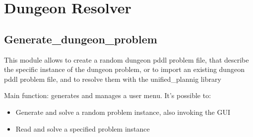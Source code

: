 \documentclass[letterpaper,10pt,english]{sphinxmanual}
\begin{document}
\section{Dungeon Resolver}
\label{\detokenize{api_reference/dungeon_resolver:dungeon-resolver}}\label{\detokenize{api_reference/dungeon_resolver::doc}}
\sphinxstepscope


\subsection{Generate\_dungeon\_problem}
\label{\detokenize{api_reference/dungeon_resolver/generate_dungeon_problem:module-generate_dungeon_problem}}\label{\detokenize{api_reference/dungeon_resolver/generate_dungeon_problem:generate-dungeon-problem}}\label{\detokenize{api_reference/dungeon_resolver/generate_dungeon_problem::doc}}
\sphinxAtStartPar
This module allows to create a random dungeon pddl problem file, that describe the specific instance of
the dungeon problem, or to import an existing dungeon pddl problem file, and to resolve them with the
unified\_plannig library

\begin{fulllineitems}
\label{\detokenize{api_reference/dungeon_resolver/generate_dungeon_problem:generate_dungeon_problem.Main}}
\pysigstartsignatures
{}
\pysigstopsignatures
\sphinxAtStartPar
Main function: generates and manages a user menu.
It’s possible to:
\begin{itemize}
\item {} 
\sphinxAtStartPar
Generate and solve a random problem instance, also invoking the GUI

\item {} 
\sphinxAtStartPar
Read and solve a specified problem instance

\end{itemize}

\end{fulllineitems}

\end{document}
